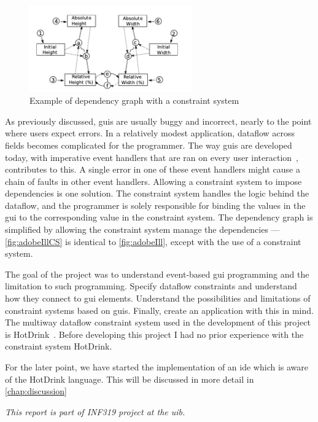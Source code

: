 \begin{figure}
    \centering
    \includegraphics[width=7cm, frame]{figures/adobeIllCS.png}
    \caption{Example of dependency graph with a constraint system}
    \label{fig:adobeIllCS}
\end{figure}

As previously discussed, \gls{gui}s are usually buggy and incorrect, nearly to the point where users expect errors. In a relatively modest application, dataflow across fields becomes complicated for the programmer. The way \gls{gui}s are developed today, with imperative event handlers that are ran on every user interaction~\cite{all2021multi}, contributes to this. A single error in one of these event handlers might cause a chain of faults in other event handlers. Allowing a constraint system to impose dependencies is one solution. The constraint system handles the logic behind the dataflow, and the programmer is solely responsible for binding the values in the \gls{gui} to the corresponding value in the constraint system. The dependency graph is simplified by allowing the constraint system manage the dependencies --- \autoref{fig:adobeIllCS} is identical to \autoref{fig:adobeIll}, except with the use of a constraint system.

The goal of the project was to understand event-based \gls{gui} programming and the limitation to such programming. Specify dataflow constraints and understand how they connect to \gls{gui} elements. Understand the possibilities and limitations of constraint systems based on \gls{gui}s. Finally, create an application with this in mind. The multiway dataflow constraint system used in the development of this project is HotDrink~\cite{HotDrink1}. Before developing this project I had no prior experience with the constraint system HotDrink.

For the later point, we have started the implementation of an \gls{ide} which is aware of the HotDrink language. This will be discussed in more detail in \autoref{chap:discussion}

\textit{This report is part of INF319 project at the \gls{uib}.}
